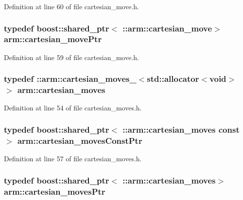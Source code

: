 \-Definition at line 60 of file cartesian\-\_\-move.\-h.

\subsubsection[{cartesian\-\_\-move\-Ptr}]{\setlength{\rightskip}{0pt plus 5cm}typedef boost\-::shared\-\_\-ptr$<$ \-::{\bf arm\-::cartesian\-\_\-move}$>$ {\bf arm\-::cartesian\-\_\-move\-Ptr}}\label{namespacearm_a894b64058325e0c3bddb38500d311f68}


\-Definition at line 59 of file cartesian\-\_\-move.\-h.

\subsubsection[{cartesian\-\_\-moves}]{\setlength{\rightskip}{0pt plus 5cm}typedef \-::{\bf arm\-::cartesian\-\_\-moves\-\_\-}$<$std\-::allocator$<$void$>$ $>$ {\bf arm\-::cartesian\-\_\-moves}}\label{namespacearm_aa178e0d907ffb9f9ced0475915159630}


\-Definition at line 54 of file cartesian\-\_\-moves.\-h.

\subsubsection[{cartesian\-\_\-moves\-Const\-Ptr}]{\setlength{\rightskip}{0pt plus 5cm}typedef boost\-::shared\-\_\-ptr$<$ \-::{\bf arm\-::cartesian\-\_\-moves} const$>$ {\bf arm\-::cartesian\-\_\-moves\-Const\-Ptr}}\label{namespacearm_ae891812ed8acb6c4b2e3d8cdf4bb9b6a}


\-Definition at line 57 of file cartesian\-\_\-moves.\-h.

\subsubsection[{cartesian\-\_\-moves\-Ptr}]{\setlength{\rightskip}{0pt plus 5cm}typedef boost\-::shared\-\_\-ptr$<$ \-::{\bf arm\-::cartesian\-\_\-moves}$>$ {\bf arm\-::cartesian\-\_\-moves\-Ptr}}\label{namespacearm_a2441ab4dd3ef755340dcc2b094d3274d}


